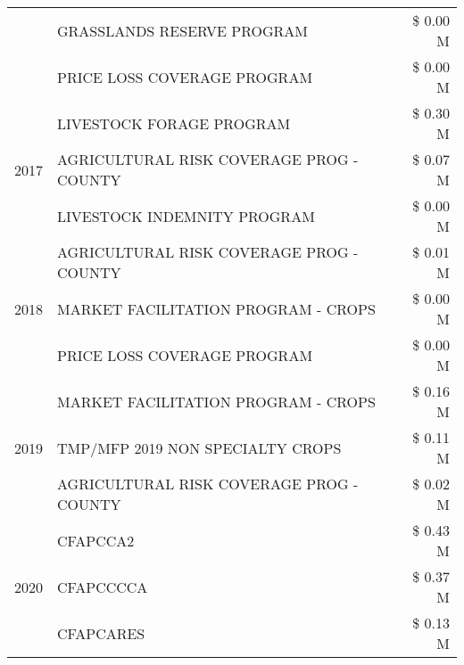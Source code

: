 \begin{tabular}{llr}
 & GRASSLANDS RESERVE PROGRAM & \$ 0.00 M \\
 & PRICE LOSS COVERAGE PROGRAM & \$ 0.00 M \\
\cline{1-3}
\multirow[t]{3}{*}{2017} & LIVESTOCK FORAGE PROGRAM & \$ 0.30 M \\
 & AGRICULTURAL RISK COVERAGE PROG - COUNTY & \$ 0.07 M \\
 & LIVESTOCK INDEMNITY PROGRAM & \$ 0.00 M \\
\cline{1-3}
\multirow[t]{3}{*}{2018} & AGRICULTURAL RISK COVERAGE PROG - COUNTY & \$ 0.01 M \\
 & MARKET FACILITATION PROGRAM - CROPS & \$ 0.00 M \\
 & PRICE LOSS COVERAGE PROGRAM & \$ 0.00 M \\
\cline{1-3}
\multirow[t]{3}{*}{2019} & MARKET FACILITATION PROGRAM - CROPS & \$ 0.16 M \\
 & TMP/MFP 2019 NON SPECIALTY CROPS & \$ 0.11 M \\
 & AGRICULTURAL RISK COVERAGE PROG - COUNTY & \$ 0.02 M \\
\cline{1-3}
\multirow[t]{3}{*}{2020} & CFAPCCA2 & \$ 0.43 M \\
 & CFAPCCCCA & \$ 0.37 M \\
 & CFAPCARES & \$ 0.13 M \\
\cline{1-3}
\bottomrule
\end{tabular}
